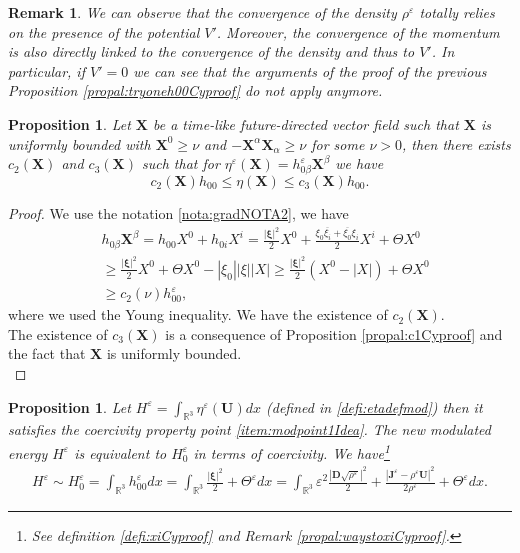 \documentclass[a4paper, 15pt]{article}
\numberwithin{equation}{section}
\newtheorem{propal}[defi]{Proposition}
\newtheorem{rem}[defi]{Remark}
\begin{document}
\begin{rem}
\label{rem:convdensityneedCyproof}
We can observe that the convergence of the density $\rho^\varepsilon$ totally relies on the presence of the potential $V'$. Moreover, the convergence of the momentum is also directly linked to the convergence of the density and thus to $V'$. In particular, if $V'=0$ we can see that the arguments of the proof of the previous Proposition \ref{propal:tryoneh00Cyproof} do not apply anymore.\\
\end{rem}
\begin{propal}
\label{propal:c2c3Cyproof}
    Let $\textbf{X}$ be a time-like future-directed vector field such that $\textbf{X}$ is uniformly bounded with $\textbf{X}^0\geq\nu$ and $-\textbf{X}^\alpha \textbf{X}_\alpha\geq\nu$ for some $\nu>0$, then there exists $c_2(\textbf{X})$ and $c_3(\textbf{X})$ such that for $\eta^\varepsilon(\textbf{X})=h^\varepsilon_{0\beta}\textbf{X}^\beta$ we have  
\begin{equation}
\label{eq:c2c3Cyproof}
		c_2(\textbf{X})h_{00}\leq\eta(\textbf{X})\leq c_3(\textbf{X})h_{00}.
\end{equation}
\end{propal}
\begin{proof}
  We use the notation \ref{nota:gradNOTA2}, we have 
\begin{align*}
&h_{0\beta}\textbf{X}^\beta=h_{00}X^0+h_{0i}X^i=\frac{|\boldsymbol{\xi}|^2}{2}X^0+\frac{\xi_0\overline{\xi_i}+\overline{\xi_0}\xi_i}{2}X^i+\Theta X^0\\
&\geq \frac{|\boldsymbol{\xi}|^2}{2}X^0+\Theta X^0-|\xi_0||\xi||X|\geq \frac{|\boldsymbol{\xi}|^2}{2}(X^0-|X|)+\Theta X^0\\
&\geq c_2(\nu)h_{00}^\varepsilon,
\end{align*}
where we used the Young inequality. We have the existence of $c_2(\textbf{X})$. \\
The existence of $c_3(\textbf{X})$ is a consequence of Proposition \ref{propal:c1Cyproof} and the fact that $\textbf{X}$ is uniformly bounded.\\
\end{proof}
\begin{propal}
\label{propal:HgoodfinalCyproof}
 Let $H^\varepsilon=\int_{\mathbb{R}^3}{\eta^\varepsilon(\textbf{U})dx}$ (defined in \ref{defi:etadefmod}) then it satisfies the coercivity property point \ref{item:modpoint1Idea}. The new modulated energy $H^\varepsilon$ is equivalent to $H^\varepsilon_0$ in terms of coercivity. We have\footnote{See definition \ref{defi:xiCyproof} and Remark \ref{propal:waystoxiCyproof}.}
 \begin{align}
     \label{eq:equivHH0Cyproof}
     H^\varepsilon\sim H^\varepsilon_0=\int_{\mathbb{R}^3}{h^\varepsilon_{00}dx}=\int_{\mathbb{R}^3}{\frac{|\boldsymbol{\xi}|^2}{2}+\Theta^\varepsilon dx}= \int_{\mathbb{R}^3}{\varepsilon^2\frac{|\textbf{D}\sqrt{\rho^\varepsilon}|^2}{2}+\frac{|\textbf{J}^\varepsilon-\rho^\varepsilon  \textbf{U}|^2}{2\rho^\varepsilon}+\Theta^\varepsilon dx}.
 \end{align}
\end{propal}
\end{document}
